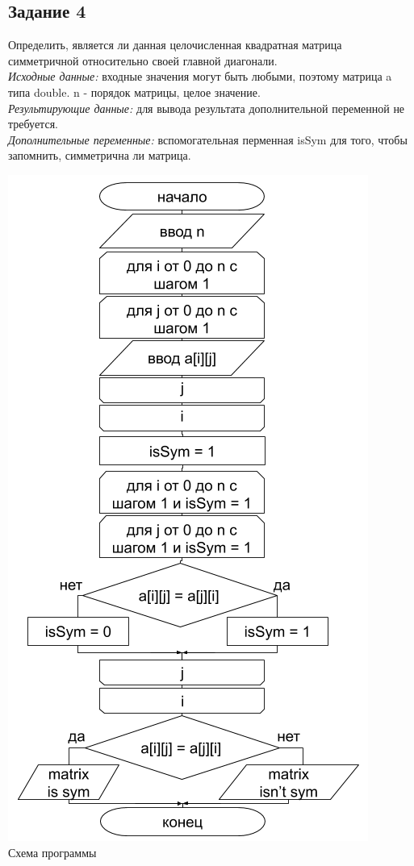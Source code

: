 \documentclass[a4paper,14pt]{extarticle}
\begin{document}
\subsection{Задание 4}
Определить, является ли данная целочисленная квадратная матрица симметричной относительно своей главной диагонали.\\
\textit{Исходные данные:} входные значения могут быть любыми, поэтому матрица a типа double. n - порядок матрицы, целое значение.\\
\textit{Результирующие данные:} для вывода результата дополнительной переменной не требуется.\\
\textit{Дополнительные переменные:} вспомогательная перменная isSym для того, чтобы запомнить, симметрична ли матрица.\\
\begin{center}
\includegraphics[scale=0.6]{lab4-4.png}\\
Схема программы
\end{center}
\end{document}
